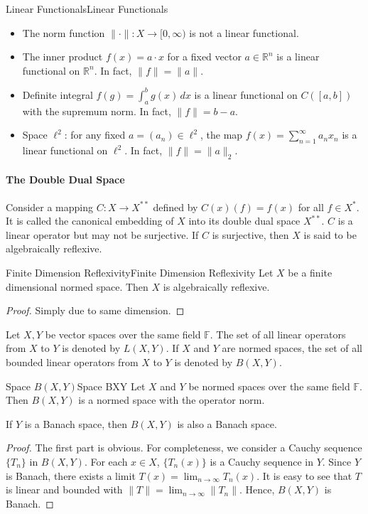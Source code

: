 \documentclass[../main.tex]{subfiles}
\begin{document}
\begin{example}{Linear Functionals}{Linear Functionals}
	\begin{itemize}
		\item The norm function $\|\cdot\|: X \rightarrow [0, \infty)$ is not a linear functional.
		\item The inner product $f(x) = a \cdot x$ for a fixed vector $a \in \mathbb{R}^n$ is a linear functional on $\mathbb{R}^n$. In fact, $\|f\| = \|a\|$.
		\item Definite integral $f(g) = \int_a^b g(x) \, dx$ is a linear functional on $C([a, b])$ with the supremum norm. In fact, $\|f\| = b - a$.
		\item Space $\ell^2$: for any fixed $a = (a_n) \in \ell^2$, the map $f(x) = \sum_{n=1}^\infty a_n x_n$ is a linear functional on $\ell^2$. In fact, $\|f\| = \|a\|_2$.
	\end{itemize}
\end{example}

\paragraph{The Double Dual Space}
Consider a mapping $C: X \rightarrow X^{**}$ defined by $C(x)(f) = f(x)$ for all $f \in X^*$. It is called the canonical embedding of $X$ into its double dual space $X^{**}$. $C$ is a linear operator but may not be surjective. If $C$ is surjective, then $X$ is said to be algebraically reflexive.

\begin{theorem}{Finite Dimension Reflexivity}{Finite Dimension Reflexivity}
	Let $X$ be a finite dimensional normed space. Then $X$ is algebraically reflexive.
\end{theorem}
\begin{proof}
Simply due to same dimension.
\end{proof}

Let $X,Y$ be vector spaces over the same field $\mathbb{F}$. The set of all linear operators from $X$ to $Y$ is denoted by $L(X,Y)$. If $X$ and $Y$ are normed spaces, the set of all bounded linear operators from $X$ to $Y$ is denoted by $B(X,Y)$.

\begin{theorem}{Space $B(X,Y)$}{Space BXY}
	Let $X$ and $Y$ be normed spaces over the same field $\mathbb{F}$. Then $B(X,Y)$ is a normed space with the operator norm.

	If $Y$ is a Banach space, then $B(X,Y)$ is also a Banach space.
\end{theorem}
\begin{proof}
	The first part is obvious. For completeness, we consider a Cauchy sequence $\{T_n\}$ in $B(X,Y)$. For each $x\in X$, $\{T_n(x)\}$ is a Cauchy sequence in $Y$. Since $Y$ is Banach, there exists a limit $T(x) = \lim_{n\rightarrow \infty} T_n(x)$. It is easy to see that $T$ is linear and bounded with $\|T\| = \lim_{n\rightarrow \infty} \|T_n\|$. Hence, $B(X,Y)$ is Banach.
\end{proof}
\end{document}
